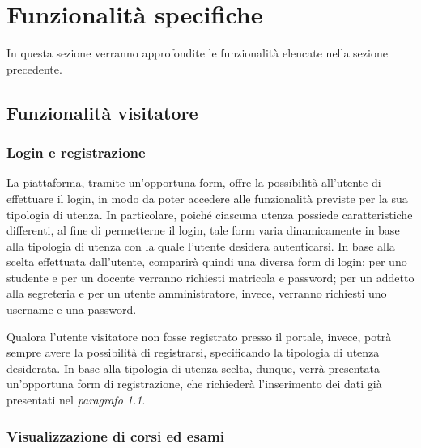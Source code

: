\documentclass [a4paper,11pt]{book}
\begin{document}
\section{Funzionalità specifiche}

In questa sezione verranno approfondite le funzionalità elencate nella sezione precedente.

\subsection{Funzionalità visitatore}

\subsubsection{Login e registrazione}

La piattaforma, tramite un'opportuna form, offre la possibilità all'utente di effettuare il login, in modo da poter accedere alle funzionalità previste per la sua tipologia di utenza. In particolare, poiché ciascuna utenza possiede caratteristiche differenti, al fine di permetterne il login, tale form varia dinamicamente in base alla tipologia di utenza con la quale l'utente desidera autenticarsi. In base alla scelta effettuata dall'utente, comparirà quindi una diversa form di login; per uno studente e per un docente verranno richiesti matricola e password; per un addetto alla segreteria e per un utente amministratore, invece, verranno richiesti uno username e una password.

Qualora l'utente visitatore non fosse registrato presso il portale, invece, potrà sempre avere la possibilità di registrarsi, specificando la tipologia di utenza desiderata. In base alla tipologia di utenza scelta, dunque, verrà presentata un'opportuna form di registrazione, che richiederà l'inserimento dei dati già presentati nel \emph{paragrafo 1.1}.

\medskip

\subsubsection{Visualizzazione di corsi ed esami}
\end{document}
